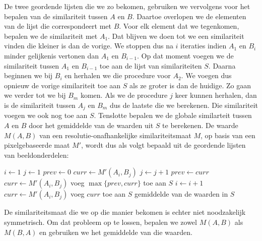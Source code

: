 De twee geordende lijsten die we zo bekomen, gebruiken we vervolgens voor het bepalen van 
de similariteit tussen $A$ en $B$. Daartoe overlopen we de elementen van de 
lijst die correspondeert met $B$. Voor
elk element dat we tegenkomen, bepalen we de similariteit met $A_1$. Dat blijven we doen
tot we een similariteit vinden die kleiner is dan de vorige. We stoppen dus na $i$ iteraties 
indien $A_1$ en $B_i$ minder gelijkenis vertonen dan $A_1$ en $B_{i-1}$. Op dat moment voegen
we de similariteit tussen $A_1$ en $B_{i-1}$ toe aan de lijst van similariteiten $S$. Daarna
beginnen we bij $B_i$ en herhalen we die procedure voor $A_2$. We voegen dus opnieuw de vorige
similariteit toe aan $S$ als ze groter is dan de huidige. Zo gaan we verder tot we bij
$B_m$ komen. Als we de procedure $j$ keer kunnen herhalen, dan
is de similariteit tussen $A_j$ en $B_m$ dus de laatste die we berekenen. Die similariteit
voegen we ook nog toe aan $S$. Tenslotte bepalen we de globale similarteit tussen $A$ en $B$ 
door het gemiddelde van de waarden uit $S$ te berekenen. De waarde $M(A,B)$ van een 
resolutie-onafhankelijke similariteitsmaat $M$, op basis van een 
pixelgebaseerde maat $M'$, wordt dus als volgt bepaald uit de geordende lijsten van
beeldonderdelen:
\begin{multicols}{2}
\begin{algorithmic}[1]
\STATE $i \leftarrow 1$
\STATE $j \leftarrow 1$
\STATE $prev \leftarrow 0$
\STATE $curr \leftarrow M'(A_i,B_j)$
\STATE $j \leftarrow j+1$
\STATE $prev \leftarrow curr$
\STATE $curr \leftarrow M'(A_i,B_j)$
\ENDWHILE
\STATE voeg $\max \{prev, curr\}$ toe aan $S$
\STATE $i \leftarrow i+1$
\ENDWHILE
{}
\STATE $curr \leftarrow M'(A_i,B_j)$
\STATE voeg $curr$ toe aan $S$
\ENDIF
\RETURN gemiddelde van de waarden in $S$
\end{algorithmic}
\end{multicols}
\noindent
De similariteitsmaat die we op die manier bekomen is echter niet noodzakelijk symmetrisch. Om dat 
probleem op te lossen, bepalen we zowel $M(A,B)$ als $M(B,A)$ en gebruiken we het gemiddelde van 
die waarden.

